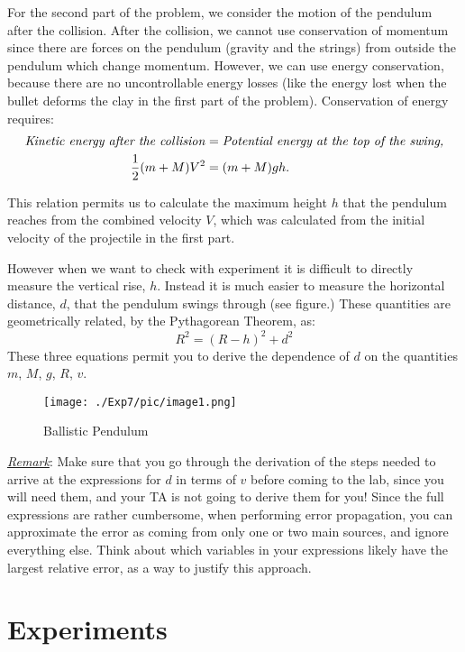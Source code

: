 For the second part of the problem, we consider the motion of the pendulum after the collision. After the collision, we cannot use conservation of momentum since there are forces on the pendulum (gravity and the strings) from outside the pendulum which change momentum. However, we can use energy conservation, because there are no uncontrollable energy losses (like the energy lost when the bullet deforms the clay in the first part of the problem). Conservation of energy requires:
\begin{align}
\text{\emph{Kinetic energy after the collision}}&= \text{\emph{Potential energy at the top of the swing,}}\notag\\
\frac{1}{2}(m+M)V^2&=(m + M)gh.
\end{align}

This relation permits us to calculate the maximum height $h$ that the pendulum reaches from the combined velocity $V$, which was calculated from the initial velocity of the projectile in the first part. \myskip

However when we want to check with experiment it is difficult to directly measure the vertical rise, $h$. Instead it is much easier to measure the horizontal distance, $d$, that the pendulum swings through (see figure.)  These quantities are geometrically related, by the Pythagorean Theorem, as:
\begin{equation}
  R^2=(R-h)^2+d^2
\end{equation}
These three equations permit you to derive the dependence of $d$ on the quantities $m$, $M$, $g$, $R$, $v$. 
\begin{figure}[h]
\centering
\texttt{[image: ./Exp7/pic/image1.png]}
\caption{Ballistic Pendulum}
\end{figure} 

\underline{\emph{Remark}}: Make sure that you go through the derivation of the steps needed to arrive at the expressions for $d$ in terms of $v$ before coming to the lab, since you will need them, and your TA is not going to derive them for you!  Since the full expressions are rather cumbersome, when performing error propagation, you can approximate the error as coming from only one or two main sources, and ignore everything else. Think about which variables in your expressions likely have the largest relative error, as a way to justify this approach. 

\section{Experiments}
